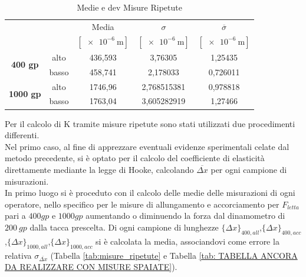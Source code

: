 \documentclass[a4paper,11pt,oneside]{article}
\begin{document}
\begin{table}[h!]
    \centering
    \begin{tabular}{|c|c|c|c|c|}
        \hline
          \multicolumn{2}{|c|}{\multirow{2}{*}{}} & Media& $\sigma$ & $\overline{\sigma}$\\
          \multicolumn{2}{|c|}{} & $[\SI{e-6}{\meter}]$ & $[\SI{e-6}{\meter}]$ & $[\SI{e-6}{\meter}]$\\ 
          \hline
          \multirow{2}{*}{\textbf{400 gp}}& {\cellcolor[rgb]{0.85,0.85,0.85}}alto & {\cellcolor[rgb]{0.85,0.85,0.85}}436,593&	{\cellcolor[rgb]{0.85,0.85,0.85}}3,76305&	{\cellcolor[rgb]{0.85,0.85,0.85}}1,25435\\ \cline{2-5}
          &basso&   458,741&	2,178033&	0,726011\\
          \hline
          \multirow{2}{*}{\textbf{1000 gp}}& {\cellcolor[rgb]{0.85,0.85,0.85}}alto & {\cellcolor[rgb]{0.85,0.85,0.85}}1746,96&	{\cellcolor[rgb]{0.85,0.85,0.85}}2,768515381&	{\cellcolor[rgb]{0.85,0.85,0.85}}0,978818\\ \cline{2-5}
          &basso&   1763,04&	3,605282919&	1,27466\\
         \hline
    \end{tabular}
    \caption{Medie e dev Misure Ripetute}
    \label{tab:medie_misure_ripetute}
\end{table}{}

Per il calcolo di K tramite misure ripetute sono stati utilizzati due procedimenti differenti.\\
Nel primo caso, al fine di apprezzare eventuali evidenze sperimentali celate dal metodo precedente, si è optato per il calcolo del coefficiente di elasticità direttamente mediante la legge di Hooke, calcolando $\overline{\Delta x}$ per ogni campione di misurazioni.\\ 

In primo luogo si è proceduto con il calcolo delle medie delle misurazioni di ogni operatore, nello specifico per le misure di allungamento e accorciamento per $F_{letta}$ pari a $\SI{400}gp$ e $\SI{1000}gp$ aumentando o diminuendo la forza dal dinamometro di $\SI{200}{gp}$ dalla tacca prescelta. Di ogni campione di lunghezze $\{ {\Delta x} \}_{400, all}$,$\{ {\Delta x} \}_{400, acc}$,$\{ {\Delta x} \}_{1000, all}$,$\{ {\Delta x} \}_{1000, acc}$ si è calcolata la media, associandovi come errore la relativa $\sigma_{\overline{\Delta x}}$ (Tabella \ref{tab:misure_ripetute} e Tabella \ref{tab: TABELLA ANCORA DA REALIZZARE CON MISURE SPAIATE}).\\
\end{document}

